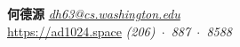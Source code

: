\documentclass{resume}
\begin{document}
	\MakeUppercase{\Large{\textbf{何德源}}} \hfill {\em{\href{mailto:dh63@cs.washington.edu}{dh63@cs.washington.edu}}}\\
	\vspace{-5pt}\href{https://ad1024.space}{https://ad1024.space} \hfill{\em (206)~$\cdot$~887~$\cdot$~8588}



\end{document}
